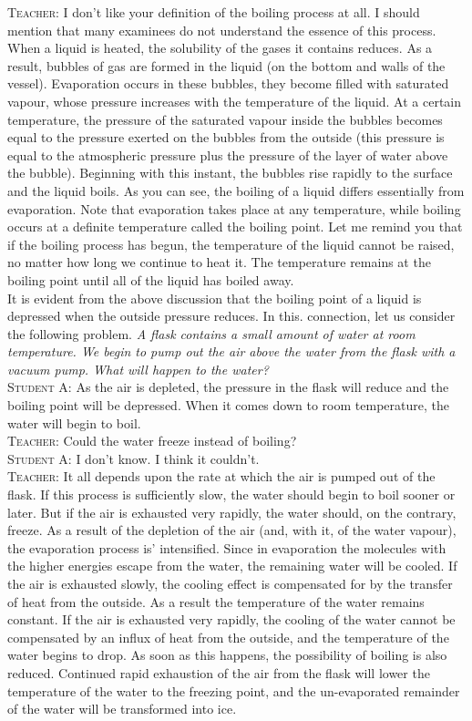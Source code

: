 \documentclass[a4paper,sfsidenotes]{tufte-book}
\begin{document}
\textsc{Teacher:} I don't like your definition of the boiling process at all. I should mention that many examinees do not understand the essence of this process. When a liquid is heated, the solubility of the gases it contains reduces. As a result, bubbles of gas are formed in the liquid (on the bottom and walls of the vessel). Evaporation occurs in these bubbles, they become filled with saturated vapour, whose pressure increases with the temperature of the liquid. At a certain temperature, the pressure of the saturated vapour inside the bubbles becomes equal to the pressure exerted on the bubbles from the outside (this pressure is equal to the atmospheric pressure plus the pressure of the layer of water above the bubble). Beginning with this instant, the bubbles rise rapidly to the surface and the liquid boils. As you can see, the boiling of a liquid differs essentially from evaporation. Note that evaporation takes place at any temperature, while boiling occurs at a definite temperature called the boiling point. Let me remind you that if the boiling process has begun, the temperature of the liquid cannot be raised, no matter how long we continue to heat it. The temperature remains at the boiling point until all of the liquid has boiled away.
\\
It is evident from the above discussion that the boiling point of a liquid is depressed when the outside pressure reduces. In this. connection, let us consider the following problem. \emph{A flask contains a small amount of water at room temperature. We begin to pump out the air above the water from the flask with a vacuum pump. What will happen to the water?}
\\
\textsc{Student A:} As the air is depleted, the pressure in the flask will reduce and the boiling point will be depressed. When it comes down to room temperature, the water will begin to boil.
\\
\textsc{Teacher:} Could the water freeze instead of boiling?
\\
\textsc{Student A:} I don't know. I think it couldn't.
\\
\textsc{Teacher:} It all depends upon the rate at which the air is pumped out of the flask. If this process is sufficiently slow, the water should begin to boil sooner or later. But if the air is exhausted very rapidly, the water should, on the contrary, freeze. As a result of the depletion of the air (and, with it, of the water vapour), the evaporation process is' intensified. Since in evaporation the molecules with the higher energies escape from the water, the remaining water will be cooled. If the air is exhausted slowly, the cooling effect is compensated for by the transfer of heat from the outside. As a result the temperature of the water remains constant. If the air is exhausted very rapidly, the cooling of the water cannot be compensated by an influx of heat from the outside, and the temperature of the water begins to drop. As soon as this happens, the possibility of boiling is also reduced. Continued rapid exhaustion of the air from the flask will lower the temperature of the water to the freezing point, and the un-evaporated remainder of the water will be transformed into ice.
\end{document}
